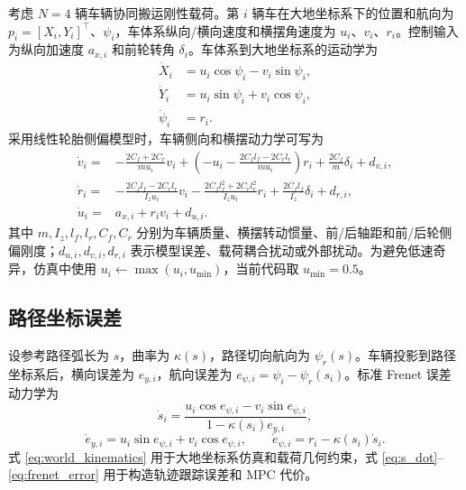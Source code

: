 \documentclass[twocolumn,3p,times,procedia]{elsarticle}
\begin{document}
考虑 $N=4$ 辆车辆协同搬运刚性载荷。第 $i$ 辆车在大地坐标系下的位置和航向为
$p_i=[X_i,Y_i]^\top$、$\psi_i$，车体系纵向/横向速度和横摆角速度为 $u_i$、$v_i$、$r_i$。控制输入为纵向加速度 $a_{x,i}$ 和前轮转角 $\delta_i$。车体系到大地坐标系的运动学为
\begin{equation}
\begin{aligned}
\dot X_i &= u_i\cos\psi_i-v_i\sin\psi_i,\\
\dot Y_i &= u_i\sin\psi_i+v_i\cos\psi_i,\\
\dot \psi_i &= r_i .
\end{aligned}
\label{eq:world_kinematics}
\end{equation}
采用线性轮胎侧偏模型时，车辆侧向和横摆动力学可写为
\begin{equation}
\begin{aligned}
\dot v_i=&-\frac{2C_f+2C_r}{m u_i}v_i+
\left(-u_i-\frac{2C_f l_f-2C_r l_r}{m u_i}\right)r_i
+\frac{2C_f}{m}\delta_i+d_{v,i},\\
\dot r_i=&-\frac{2C_f l_f-2C_r l_r}{I_z u_i}v_i
-\frac{2C_f l_f^2+2C_r l_r^2}{I_z u_i}r_i
+\frac{2C_f l_f}{I_z}\delta_i+d_{r,i},\\
\dot u_i=&a_{x,i}+r_i v_i+d_{u,i}.
\end{aligned}
\label{eq:bicycle_dynamics}
\end{equation}
其中 $m,I_z,l_f,l_r,C_f,C_r$ 分别为车辆质量、横摆转动惯量、前/后轴距和前/后轮侧偏刚度；$d_{u,i},d_{v,i},d_{r,i}$ 表示模型误差、载荷耦合扰动或外部扰动。为避免低速奇异，仿真中使用 $u_i\leftarrow\max(u_i,u_{\min})$，当前代码取 $u_{\min}=0.5$。

\subsection{路径坐标误差}

设参考路径弧长为 $s$，曲率为 $\kappa(s)$，路径切向航向为 $\psi_r(s)$。车辆投影到路径坐标系后，横向误差为 $e_{y,i}$，航向误差为 $e_{\psi,i}=\psi_i-\psi_r(s_i)$。标准 Frenet 误差动力学为
\begin{equation}
\dot s_i=\frac{u_i\cos e_{\psi,i}-v_i\sin e_{\psi,i}}
{1-\kappa(s_i)e_{y,i}},
\label{eq:s_dot}
\end{equation}
\begin{equation}
\dot e_{y,i}=u_i\sin e_{\psi,i}+v_i\cos e_{\psi,i},\qquad
\dot e_{\psi,i}=r_i-\kappa(s_i)\dot s_i .
\label{eq:frenet_error}
\end{equation}
式 \eqref{eq:world_kinematics} 用于大地坐标系仿真和载荷几何约束，式 \eqref{eq:s_dot}--\eqref{eq:frenet_error} 用于构造轨迹跟踪误差和 MPC 代价。
\end{document}
